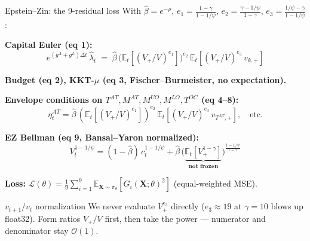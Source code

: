 \documentclass[aspectratio=169,11pt]{beamer}
\newcommand{\X}{\bm{X}}
\begin{document}
\begin{frame}{Epstein--Zin: the 9-residual loss}
\footnotesize
With $\hat\beta = e^{-\rho}$, $e_1 = \frac{1-\gamma}{1-1/\psi}$, $e_2 = \frac{\gamma - 1/\psi}{1-\gamma}$, $e_3 = \frac{1/\psi - \gamma}{1-1/\psi}$:

\textbf{Capital Euler (eq 1):}
\[
e^{(g^{\!A}+g^{\!L})\Delta t}\,\hat\lambda_t \;=\; \hat\beta\,\big(\mathbb{E}_t[(V_+/V)^{e_1}]\big)^{e_2}\,\mathbb{E}_t\!\left[(V_+/V)^{e_3}\,v_{k,+}\right]
\]

\textbf{Budget (eq 2), KKT-$\mu$ (eq 3, Fischer–Burmeister, no expectation).}

\textbf{Envelope conditions on $T^{\!AT}, M^{\!AT}, M^{\!UO}, M^{\!LO}, T^{\!OC}$ (eq 4–8):}
\[
\eta^{\!AT}_t = \hat\beta\,(\mathbb{E}_t[(V_+/V)^{e_1}])^{e_2}\,\mathbb{E}_t[(V_+/V)^{e_3}\,v_{T^{\!AT}\!,+}], \quad \text{etc.}
\]

\textbf{EZ Bellman (eq 9, Bansal–Yaron normalized):}
\[
V_t^{1-1/\psi} = (1-\hat\beta)\,c_t^{1-1/\psi} + \hat\beta\,\big(\underbrace{\mathbb{E}_t[V_+^{1-\gamma}]}_{\textbf{not frozen}}\big)^{\!\frac{1-1/\psi}{1-\gamma}}
\]

\textbf{Loss:} $\mathcal{L}(\theta) = \frac{1}{9}\sum_{i=1}^{9}\mathbb{E}_{\X\sim\pi_\theta}[G_i(\X;\theta)^2]$ \quad (equal-weighted MSE).

\begin{alertblock}{$v_{t+1}/v_t$ normalization}
We never evaluate $V_+^{e_3}$ directly ($e_3 \approx 19$ at $\gamma=10$ blows up float32). Form ratios $V_+/V$ first, then take the power --- numerator and denominator stay $\mathcal{O}(1)$.
\end{alertblock}
\end{frame}
\end{document}
